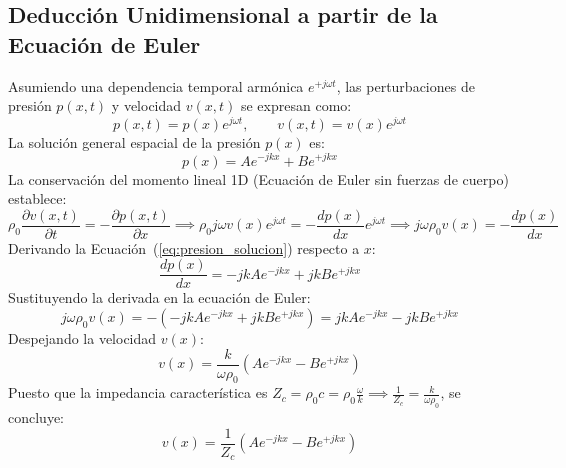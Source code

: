 \documentclass[11pt,a4paper]{article}
\begin{document}
\subsection{Deducción Unidimensional a partir de la Ecuación de Euler}
Asumiendo una dependencia temporal armónica $e^{+j\omega t}$, las perturbaciones de presión $p(x,t)$ y velocidad $v(x,t)$ se expresan como:
\begin{equation}
p(x,t) = p(x) e^{j\omega t}, \qquad v(x,t) = v(x) e^{j\omega t}
\end{equation}
La solución general espacial de la presión $p(x)$ es:
\begin{equation}
p(x) = A e^{-j k x} + B e^{+j k x}
\label{eq:presion_solucion}
\end{equation}
La conservación del momento lineal 1D (Ecuación de Euler sin fuerzas de cuerpo) establece:
\begin{equation}
\rho_0 \frac{\partial v(x,t)}{\partial t} = -\frac{\partial p(x,t)}{\partial x} \implies \rho_0 j \omega v(x) e^{j\omega t} = -\frac{d p(x)}{d x} e^{j\omega t} \implies j \omega \rho_0 v(x) = -\frac{d p(x)}{d x}
\end{equation}
Derivando la Ecuación~(\ref{eq:presion_solucion}) respecto a $x$:
\begin{equation}
\frac{d p(x)}{d x} = -j k A e^{-j k x} + j k B e^{+j k x}
\end{equation}
Sustituyendo la derivada en la ecuación de Euler:
\begin{equation}
j \omega \rho_0 v(x) = - \left( -j k A e^{-j k x} + j k B e^{+j k x} \right) = j k A e^{-j k x} - j k B e^{+j k x}
\end{equation}
Despejando la velocidad $v(x)$:
\begin{equation}
v(x) = \frac{k}{\omega \rho_0} \left( A e^{-j k x} - B e^{+j k x} \right)
\end{equation}
Puesto que la impedancia característica es $Z_c = \rho_0 c = \rho_0 \frac{\omega}{k} \implies \frac{1}{Z_c} = \frac{k}{\omega \rho_0}$, se concluye:
\begin{equation}
v(x) = \frac{1}{Z_c} \left( A e^{-j k x} - B e^{+j k x} \right)
\label{eq:velocidad_solucion}
\end{equation}
\end{document}
